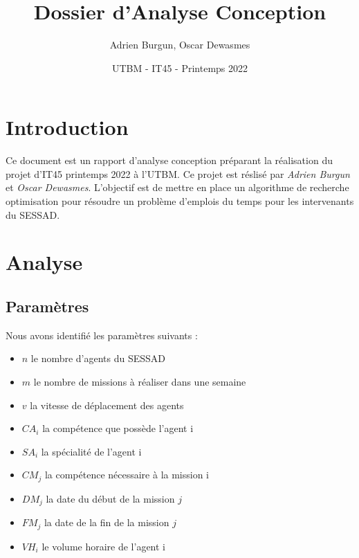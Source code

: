 \documentclass[11pt]{article}
\title{\textbf{Dossier d'Analyse Conception}}
\author{Adrien Burgun, Oscar Dewasmes}
\date{UTBM - IT45 - Printemps 2022} %
\begin{document}
\maketitle


\newpage
\tableofcontents


\newpage
\section{Introduction}

Ce document est un rapport d'analyse conception préparant la réalisation du projet d'IT45 printemps 2022 à l'UTBM. Ce projet est réslisé par \emph{Adrien Burgun} et \emph{Oscar Dewasmes}. L'objectif est de mettre en place un algorithme de recherche optimisation pour résoudre un problème d'emplois du temps pour les intervenants du SESSAD.


\newpage
\section{Analyse}


\subsection{Paramètres}


Nous avons identifié les paramètres suivants :
\begin{itemize}
    \item $n$ \tabto{2cm} le nombre d'agents du SESSAD
    \item $m$ \tabto{2cm} le nombre de missions à réaliser dans une semaine
    \item $v$ \tabto{2cm} la vitesse de déplacement des agents
    \item $CA_i$ \tabto{2cm} la compétence que possède l'agent i
    \item $SA_i$ \tabto{2cm} la spécialité de l'agent i
    \item $CM_j$ \tabto{2cm} la compétence nécessaire à la mission i
    \item $DM_j$ \tabto{2cm} la date du début de la mission $j$
    \item $FM_j$ \tabto{2cm} la date de la fin de la mission $j$
    \item $VH_i$ \tabto{2cm} le volume horaire de l'agent i
\end{itemize}
\end{document}
